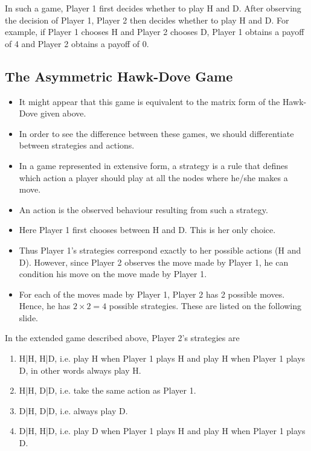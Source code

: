 \documentclass[]{report}
\begin{document}
In such a game, Player 1 first decides whether to play H and D.
After observing the decision of Player 1, Player 2 then decides
whether to play H and D.
For example, if Player 1 chooses H and Player 2 chooses D, Player
1 obtains a payoff of 4 and Player 2 obtains a payoff of 0.

\subsection{The Asymmetric Hawk-Dove Game}

\begin{itemize}
\item It might appear that this game is equivalent to the matrix form of
	the Hawk-Dove given above.
\item In order to see the difference between these games, we should
	differentiate between strategies and actions.
\item In a game represented in extensive form, a strategy is a rule that
	defines which action a player should play at all the nodes where
	he/she makes a move.
\item An action is the observed behaviour resulting from such a strategy.
\end{itemize}


\begin{itemize}
	\item Here Player 1 first chooses between H and D. This is her only
	choice. 
	\item Thus Player 1’s strategies correspond exactly to her
	possible actions (H and D).
	However, since Player 2 observes the move made by Player 1, he
	can condition his move on the move made by Player 1.
	\item For each of the moves made by Player 1, Player 2 has 2 possible
	moves. Hence, he has $2 \times 2 = 4$ possible strategies. These are
	listed on the following slide.
\end{itemize}


In the extended game described above, Player 2’s strategies are
\begin{enumerate}
	\item  H|H, H|D, i.e. play H when Player 1 plays H and
	play H when Player 1 plays D, in other words always
	play H.
	\item  H|H, D|D, i.e. take the same action as Player 1.
	\item  D|H, D|D, i.e. always play D.
	\item  D|H, H|D, i.e. play D when Player 1 plays H and
	play H when Player 1 plays D.
\end{enumerate}
\end{document}

